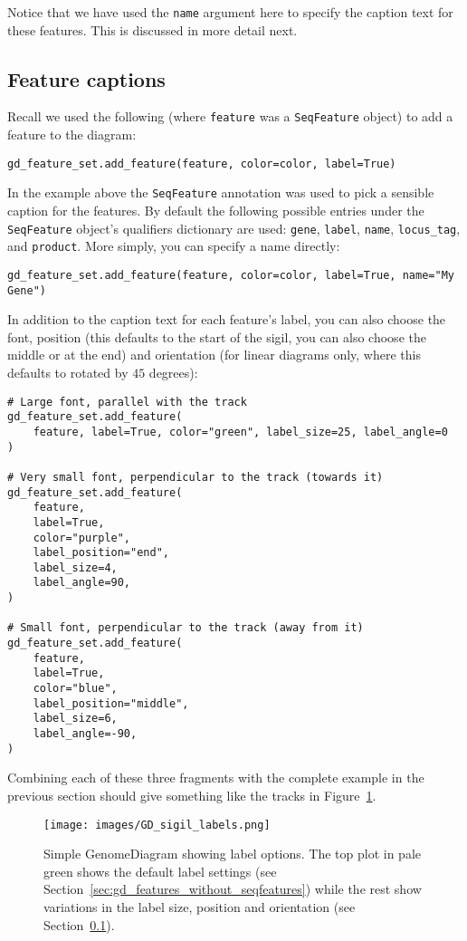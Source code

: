 Notice that we have used the \texttt{name} argument here to specify the
caption text for these features.  This is discussed in more detail next.

\subsection{Feature captions}
\label{sec:gd_feature_captions}

Recall we used the following (where \texttt{feature} was a
\verb|SeqFeature| object) to add a feature to the diagram:

\begin{verbatim}
gd_feature_set.add_feature(feature, color=color, label=True)
\end{verbatim}

In the example above the \verb|SeqFeature| annotation was used to pick a
sensible caption for the features.  By default the following possible entries
under the \verb|SeqFeature| object's qualifiers dictionary are used:
\texttt{gene}, \texttt{label}, \texttt{name}, \texttt{locus\_tag}, and
\texttt{product}.  More simply, you can specify a name directly:

\begin{verbatim}
gd_feature_set.add_feature(feature, color=color, label=True, name="My Gene")
\end{verbatim}

In addition to the caption text for each feature's label, you can also choose
the font, position (this defaults to the start of the sigil, you can also
choose the middle or at the end) and orientation (for linear diagrams only,
where this defaults to rotated by $45$ degrees):

\begin{verbatim}
# Large font, parallel with the track
gd_feature_set.add_feature(
    feature, label=True, color="green", label_size=25, label_angle=0
)

# Very small font, perpendicular to the track (towards it)
gd_feature_set.add_feature(
    feature,
    label=True,
    color="purple",
    label_position="end",
    label_size=4,
    label_angle=90,
)

# Small font, perpendicular to the track (away from it)
gd_feature_set.add_feature(
    feature,
    label=True,
    color="blue",
    label_position="middle",
    label_size=6,
    label_angle=-90,
)
\end{verbatim}

\noindent Combining each of these three fragments with the complete example
in the previous section should give something like
the tracks in Figure~\ref{fig:gd_sigil_labels}.
\begin{figure}[htbp]
\centering
\texttt{[image: images/GD\_sigil\_labels.png]}
\caption{Simple GenomeDiagram showing label options.
The top plot in pale green shows the default label settings (see
Section~\ref{sec:gd_features_without_seqfeatures}) while the rest show
variations in the label size, position and orientation (see
Section~\ref{sec:gd_feature_captions}).
}
\label{fig:gd_sigil_labels}
\end{figure}

